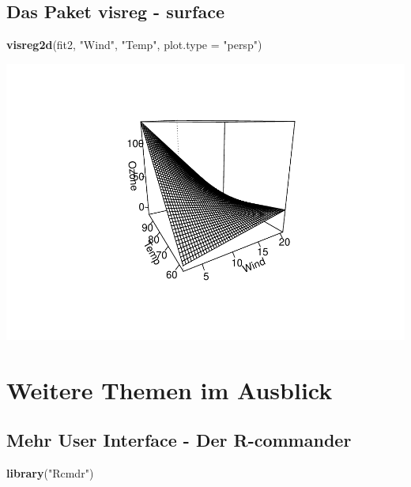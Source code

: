 \documentclass[]{article}
\newenvironment{Shaded}{\begin{snugshade}}{\end{snugshade}}
\newcommand{\KeywordTok}[1]{\textcolor[rgb]{0.13,0.29,0.53}{\textbf{{#1}}}}
\newcommand{\DataTypeTok}[1]{\textcolor[rgb]{0.13,0.29,0.53}{{#1}}}
\newcommand{\StringTok}[1]{\textcolor[rgb]{0.31,0.60,0.02}{{#1}}}
\newcommand{\NormalTok}[1]{{#1}}
\begin{document}
\subsection{Das Paket visreg -
surface}\label{das-paket-visreg---surface}

\begin{Shaded}
\begin{Highlighting}[]
\KeywordTok{visreg2d}\NormalTok{(fit2, }\StringTok{"Wind"}\NormalTok{, }\StringTok{"Temp"}\NormalTok{, }\DataTypeTok{plot.type =} \StringTok{"persp"}\NormalTok{)}
\end{Highlighting}
\end{Shaded}

\includegraphics{Intro_Datenanalyse1_files/figure-latex/unnamed-chunk-288-1.pdf}

\section{Weitere Themen im Ausblick}\label{weitere-themen-im-ausblick}

\subsection{Mehr User Interface - Der
R-commander}\label{mehr-user-interface---der-r-commander}

\begin{Shaded}
\begin{Highlighting}[]
\KeywordTok{library}\NormalTok{(}\StringTok{"Rcmdr"}\NormalTok{)}
\end{Highlighting}
\end{Shaded}
\end{document}
